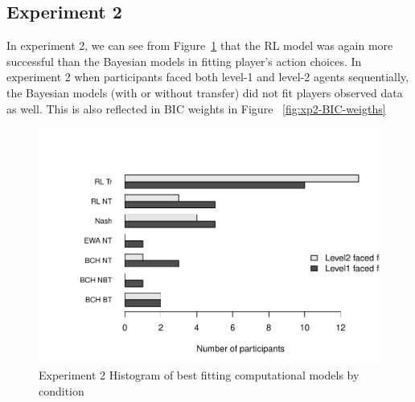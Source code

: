 \documentclass[man,floatsintext]{apa6}
\begin{document}
\hypertarget{experiment-2-1}{%
\subsection{Experiment 2}\label{experiment-2-1}}

In experiment 2, we can see from Figure~\ref{fig:exp2-comp-models} that the RL model was again more successful than the Bayesian models in fitting player's action choices. In experiment 2 when participants faced both level-1 and level-2 agents sequentially, the Bayesian models (with or without transfer) did not fit players observed data as well. This is also reflected in BIC weights in Figure ~\ref{fig:xp2-BIC-weigths}

\begin{figure}

{\centering \includegraphics[width=\textwidth]{paper_draft_2021_files/figure-latex/exp2-comp-models-1} 

}

\caption{Experiment 2 Histogram of best fitting computational models by condition}\label{fig:exp2-comp-models}
\end{figure}
\end{document}
